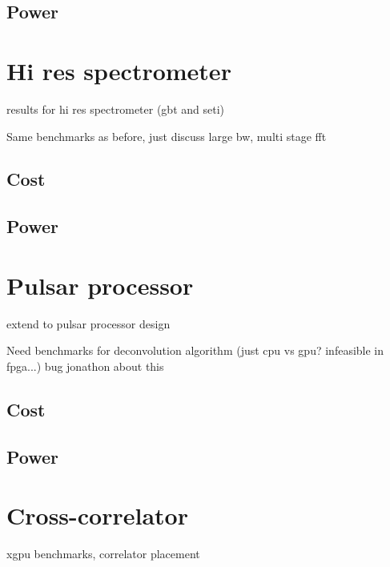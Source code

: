 \subsection{Power}

\section{Hi res spectrometer}
results for hi res spectrometer (gbt and seti)

Same benchmarks as before, just discuss large bw, multi stage fft
\subsection{Cost}
\subsection{Power}

\section{Pulsar processor}
extend to pulsar processor design

Need benchmarks for deconvolution algorithm (just cpu vs gpu? infeasible in fpga...) bug jonathon about this
\subsection{Cost}
\subsection{Power}

\section{Cross-correlator}
xgpu benchmarks, correlator placement

